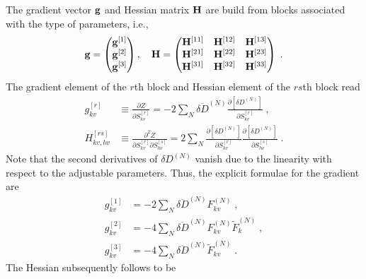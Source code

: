 \documentclass[aip,amsmath,amssymb,reprint]{revtex4-1}
\begin{document}
The gradient vector ${\bf g}$ and Hessian matrix ${\bf H}$ 
are build from blocks associated with the type of parameters, i.e.,
%
\begin{equation}\label{e:Newton.gH}
 {\bf g} = 
\begin{pmatrix}
{\bf g}^{[1]} \\ 
{\bf g}^{[2]} \\ 
{\bf g}^{[3]}
\end{pmatrix} ,\quad
 {\bf H} = 
\begin{pmatrix}
{\bf H}^{[11]} & {\bf H}^{[12]} & {\bf H}^{[13]} \\ 
{\bf H}^{[21]} & {\bf H}^{[22]} & {\bf H}^{[23]} \\ 
{\bf H}^{[31]} & {\bf H}^{[32]} & {\bf H}^{[33]} 
\end{pmatrix} \;.
\end{equation}
%
The gradient element of the $r$th block and Hessian element of the $rs$th block read
%
\begin{subequations}
 \begin{align}
  g^{[r ]}_{kv}    &\equiv \frac{\partial   Z}{\partial S_{kv}^{[r]}} 
     =-2\sum_N \overline{\delta D}^{(N)}
               \frac{\partial   \left[ \delta D^{(N)} \right]}{\partial S_{kv}^{[r]}} \;,\\
  H^{[rs]}_{kv,lw} &\equiv \frac{\partial^2 Z}{\partial S_{kv}^{[r]} \partial S_{lw}^{[s]}}  
     = 2\sum_N 
        \frac{\partial   \left[ \delta D^{(N)} \right]}{\partial S_{kv}^{[r]}}
        \frac{\partial   \left[ \delta D^{(N)} \right]}{\partial S_{lw}^{[s]}} \;.
 \end{align}
\end{subequations}
%
Note that the second derivatives of $\delta D^{(N)}$ vanish
due to the linearity with respect to the adjustable parameters.
Thus, the explicit formulae for the gradient are
%
\begin{subequations}
 \begin{align}
  g^{[1]}_{kv} &=-2\sum_N \overline{\delta D}^{(N)} F^{(N)}_{kv} \;,\\
  g^{[2]}_{kv} &=-4\sum_N \overline{\delta D}^{(N)} F^{(N)}_{kv} \widetilde{F}^{(N)}_k \;,\\
  g^{[3]}_{kv} &=-4\sum_N \overline{\delta D}^{(N)} \widetilde{F}^{(N)}_{kv} \;.
 \end{align}
\end{subequations}
%
The Hessian subsequently follows to be
%
\end{document}

